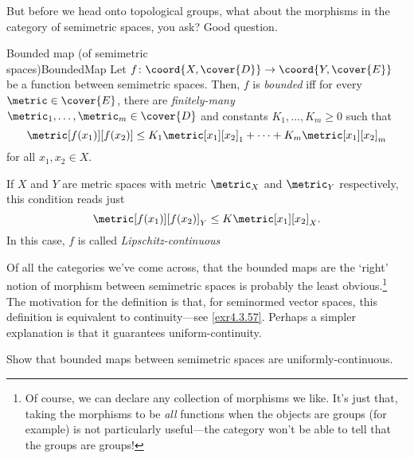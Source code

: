 But before we head onto topological groups, what about the morphisms in the category of semimetric spaces, you ask?  Good question.
\begin{dfn}{Bounded map (of semimetric \\ spaces)}{BoundedMap}
Let $f\colon \coord{X,\cover{D}}\rightarrow \coord{Y,\cover{E}}$ be a function between semimetric spaces.  Then, $f$ is \emph{bounded} iff for every $\metric \in \cover{E}$, there are \emph{finitely-many} $\metric _1,\ldots ,\metric _m\in \cover{D}$ and constants $K_1,\ldots ,K_m\geq 0$ such that
\begin{equation}
\metric[f(x_1)][f(x_2)]\leq K_1\metric[x_1][x_2]_1+\cdots +K_m\metric[x_1][x_2]_m
\end{equation}
for all $x_1,x_2\in X$.
\begin{rmk}
If $X$ and $Y$ are metric spaces with metric $\metric _X$ and $\metric _Y$ respectively, this condition reads just
\begin{equation}
\metric[f(x_1)][f(x_2)]_Y\leq K\metric[x_1][x_2]_X.
\end{equation}
In this case, $f$ is called \emph{Lipschitz-continuous}
\end{rmk}
\begin{rmk}
Of all the categories we've come across, that the bounded maps are the `right' notion of morphism between semimetric spaces is probably the least obvious.\footnote{Of course, we can declare any collection of morphisms we like.  It's just that, taking the morphisms to be \emph{all} functions when the objects are groups (for example) is not particularly useful---the category won't be able to tell that the groups are groups!}  The motivation for the definition is that, for seminormed vector spaces, this definition is equivalent to continuity---see \cref{exr4.3.57}.  Perhaps a simpler explanation is that it guarantees uniform-continuity.
\end{rmk}
\end{dfn}
\begin{exr}{}{}
Show that bounded maps between semimetric spaces are uniformly-continuous.
\end{exr}
